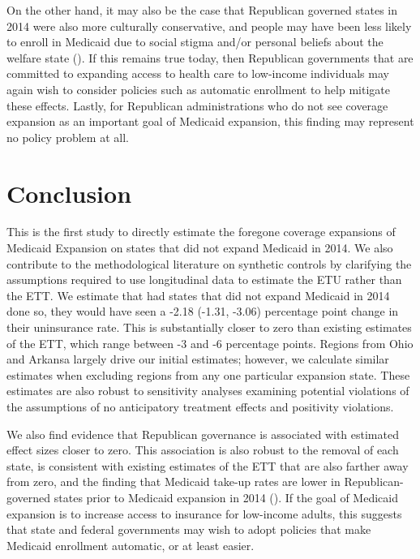 \documentclass[12pt]{article}
\begin{document}
On the other hand, it may also be the case that Republican governed states in 2014 were also more culturally conservative, and people may have been less likely to enroll in Medicaid due to social stigma and/or personal beliefs about the welfare state (\cite{sommers2012understanding}). If this remains true today, then Republican governments that are committed to expanding access to health care to low-income individuals may again wish to consider policies such as automatic enrollment to help mitigate these effects. Lastly, for Republican administrations who do not see coverage expansion as an important goal of Medicaid expansion, this finding may represent no policy problem at all.

\section{Conclusion}

This is the first study to directly estimate the foregone coverage expansions of Medicaid Expansion on states that did not expand Medicaid in 2014. We also contribute to the methodological literature on synthetic controls by clarifying the assumptions required to use longitudinal data to estimate the ETU rather than the ETT. We estimate that had states that did not expand Medicaid in 2014 done so, they would have seen a -2.18 (-1.31, -3.06) percentage point change in their uninsurance rate. This is substantially closer to zero than existing estimates of the ETT, which range between -3 and -6 percentage points. Regions from Ohio and Arkansa largely drive our initial estimates; however, we calculate similar estimates when excluding regions from any one particular expansion state. These estimates are also robust to sensitivity analyses examining potential violations of the assumptions of no anticipatory treatment effects and positivity violations. 

We also find evidence that Republican governance is associated with estimated effect sizes closer to zero. This association is also robust to the removal of each state, is consistent with existing estimates of the ETT that are also farther away from zero, and the finding that Medicaid take-up rates are lower in Republican-governed states prior to Medicaid expansion in 2014 (\cite{sommers2012understanding}). If the goal of Medicaid expansion is to increase access to insurance for low-income adults, this suggests that state and federal governments may wish to adopt policies that make Medicaid enrollment automatic, or at least easier.
\end{document}
